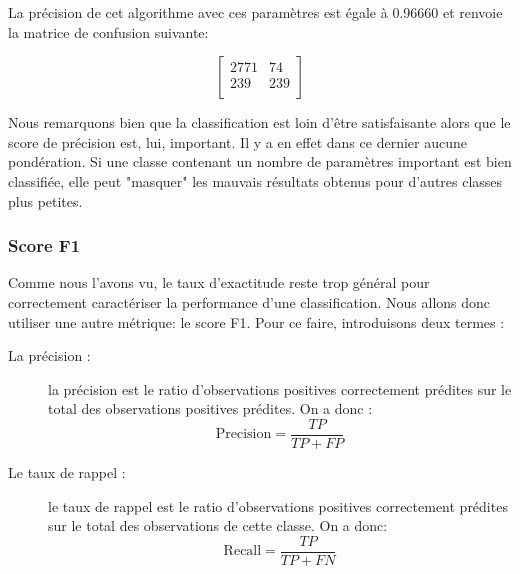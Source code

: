 \documentclass[a4paper]{report}
\begin{document}
\begin{center}
\noindent
{}
\end{center}
\medbreak

La précision de cet algorithme avec ces paramètres est égale à 0.96660 et renvoie la matrice de confusion suivante:

$$\begin{bmatrix}
2771 & 74 \\ 
239 & 239 \\
\end{bmatrix}$$

\medskip
Nous remarquons bien que la classification est loin d'être satisfaisante alors que le score de précision est, lui, important. Il y a en effet dans ce dernier aucune pondération. Si une classe contenant un nombre de paramètres important est bien classifiée, elle peut "masquer" les mauvais résultats obtenus pour d'autres classes plus petites.

\subsubsection{Score F1}
Comme nous l'avons vu, le taux d'exactitude reste trop général pour correctement caractériser la performance d'une classification. Nous allons donc utiliser une autre métrique: le score F1. Pour ce faire, introduisons deux termes :

\begin{description}
\item[La précision :] la précision est le ratio d’observations positives correctement prédites sur le total des observations positives prédites. On a donc : \begin{equation}
\text{Precision} = \dfrac{TP}{TP+FP}
\end{equation}
\item[Le taux de rappel :] le taux de rappel est le ratio d'observations positives correctement prédites sur le total des observations de cette classe. On a donc: \begin{equation}
\text{Recall} = \dfrac{TP}{TP+FN}
\end{equation}
\end{description}
\end{document}
